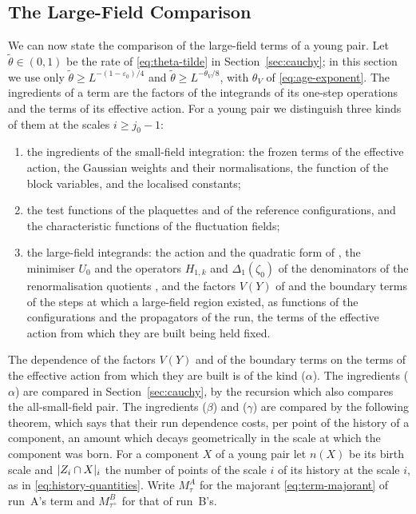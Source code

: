 \documentclass[11pt]{preprint}
\DeclarePairedDelimiter{\abs}{\lvert}{\rvert}
\numberwithin{equation}{section}
\theoremstyle{definition}
\theoremstyle{remark}
\theoremstyle{plain}
\begin{document}
\subsection{The Large-Field Comparison}\label{sec:lf-comparison}

We can now state the comparison of the large-field terms of a young pair. Let $\tilde\theta \in (0, 1)$ be the rate of \eqref{eq:theta-tilde} in Section~\ref{sec:cauchy}; in this section we use only $\tilde\theta \geq L^{-(1-\varepsilon_0)/4}$ and $\tilde\theta \geq L^{-\theta_V/8}$, with $\theta_V$ of \eqref{eq:age-exponent}. The ingredients of a term are the factors of the integrands of its one-step operations and the terms of its effective action. For a young pair we distinguish three kinds of them at the scales $i \geq j_0 - 1$:
\begin{enumerate}[label=($\alpha$)]
\item[($\alpha$)] the ingredients of the small-field integration: the frozen terms of the effective action, the Gaussian weights and their normalisations, the function \cite[(1.6), p.~178]{BalabanLFR1} of the block variables, and the localised constants;
\item[($\beta$)] the test functions of the plaquettes and of the reference configurations, and the characteristic functions of the fluctuation fields;
\item[($\gamma$)] the large-field integrands: the action and the quadratic form of \cite[(1.70), p.~377]{BalabanLFR2}, the minimiser $U_0$ and the operators $H_{1,k}$ and $\Delta_1(\zeta_0)$ of the denominators of the renormalisation quotients \cite[(1.1)--(1.2), p.~356]{BalabanLFR2}, and the factors $V(Y)$ of \cite[(1.91)]{BalabanLFR2} and the boundary terms of the steps at which a large-field region existed, as functions of the configurations and the propagators of the run, the terms of the effective action from which they are built being held fixed.
\end{enumerate}
The dependence of the factors $V(Y)$ and of the boundary terms on the terms of the effective action from which they are built is of the kind ($\alpha$).
The ingredients ($\alpha$) are compared in Section~\ref{sec:cauchy}, by the recursion which also compares the all-small-field pair. The ingredients ($\beta$) and ($\gamma$) are compared by the following theorem, which says that their run dependence costs, per point of the history of a component, an amount which decays geometrically in the scale at which the component was born. For a component $X$ of a young pair let $n(X)$ be its birth scale and $\abs{Z_i \cap X}_i$ the number of points of the scale $i$ of its history at the scale $i$, as in \eqref{eq:history-quantities}. Write $M^A_\tau$ for the majorant \eqref{eq:term-majorant} of run~A's term and $M^B_{\tau^+}$ for that of run~B's.
\end{document}
